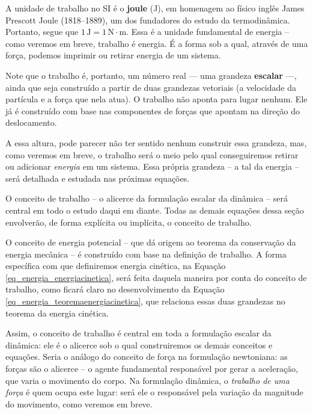  
A unidade de trabalho no SI é o \textbf{joule} (J), em homenagem ao físico inglês
James Prescott Joule (1818--1889), um dos fundadores do estudo da termodinâmica.
Portanto, segue que $1\,\text{J} = 1\,\text{N}\cdot\text{m}$. Essa é a unidade fundamental de energia -- como veremos em breve, trabalho é energia. É a forma sob a qual, através de uma força, podemos imprimir ou retirar energia de um sistema.

Note que o trabalho é, portanto, um número real --- uma grandeza \textbf{escalar}
---, ainda que seja construído a partir de duas grandezas vetoriais (a velocidade da partícula e a força que nela atua). O trabalho não aponta para lugar nenhum. Ele já é construído com base nas componentes de forças que apontam na direção do deslocamento.

A essa altura, pode parecer não ter sentido nenhum construir essa grandeza, mas, como veremos em breve, o trabalho será o meio pelo qual conseguiremos retirar ou adicionar \emph{energia} em um sistema. Essa própria grandeza -- a tal da energia -- será detalhada e estudada nas próximas equações.





O conceito de trabalho -- o alicerce da formulação escalar da dinâmica -- será central em todo o estudo daqui em diante. Todas as demais equações dessa seção envolverão, de forma explícita ou implícita, o conceito de trabalho.

O conceito de energia potencial -- que dá origem ao teorema da conservação da energia mecânica -- é construído com base na definição de trabalho. A forma específica com que definiremos energia cinética, na Equação \eqref{eq_energia_energiacinetica}, será feita daquela maneira por conta do conceito de trabalho, como ficará claro no desenvolvimento da Equação \eqref{eq_energia_teoremaenergiacinetica}, que relaciona essas duas grandezas no teorema da energia cinética.

Assim, o conceito de trabalho é central em toda a formulação escalar da dinâmica: ele é o alicerce sob o qual construiremos os demais conceitos e equações. Seria o análogo do conceito de força na formulação newtoniana: as forças são o alicerce -- o agente fundamental responsável por gerar a aceleração, que varia o movimento do corpo. Na formulação dinâmica, o \emph{trabalho de uma força} é quem ocupa este lugar: será ele o responsável pela variação da magnitude do movimento, como veremos em breve.





